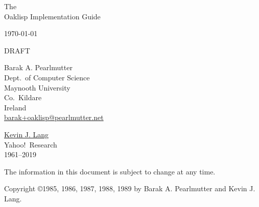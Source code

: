 %
%
%


\begin{titlepage}

\begin{center}

\vspace*{1in}

\Huge
 The \\
 Oaklisp Implementation Guide \\

\vspace{.5in}

\large
 \today \\

\vspace{.25in}

\Huge
 DRAFT \\

\vspace{.5in}

\Large
 Barak A. Pearlmutter \\
\large
 Dept.\ of Computer Science\\
 Maynooth University\\
 Co.\ Kildare\\
 Ireland\\
 \href{mailto:barak+oaklisp@pearlmutter.net}{barak+oaklisp@pearlmutter.net}

\vspace{.5in}

\Large
 \href{https://docs.google.com/document/d/1VAebgWKorNpPnE6ClFqxQ5ZTUm2OtTg9C0M85qDCirU}{Kevin J. Lang} \\
\large
 Yahoo!\ Research \\
 1961--2019

\vfill

\vspace{0.25in}

 The information in this document is subject to change at any time.

\end{center}

\end{titlepage}


\thispagestyle{empty}

\vspace*{6in}

\normalsize
\noindent Copyright \copyright 1985, 1986, 1987, 1988, 1989
 by Barak A. Pearlmutter and Kevin J. Lang.


\newpage




